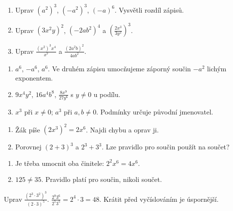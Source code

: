 \documentclass[11pt,a4paper]{article}
\begin{document}



\begin{zadaniReseniBox}[title={Základ: který vzorec použít jako první?},breakable=false]
\begin{enumerate}[label=\alph*)]
\item Uprav $(a^2)^3$, $(-a^2)^3$, $(-a)^6$. Vysvětli rozdíl zápisů.
\item Uprav $(3x^2y)^2$, $(-2ab^2)^4$ a $\left(\frac{2x^3}{3y^2}\right)^3$.
\item Uprav $\frac{(x^2)^3x^4}{x^7}$ a $\frac{(2a^2b)^2}{4ab^2}$.
\end{enumerate}
\tcblower
\begin{enumerate}[label=\alph*)]
\item $a^6$, $-a^6$, $a^6$. Ve druhém zápisu umocňujeme záporný součin $-a^2$ lichým exponentem.
\item $9x^4y^2$, $16a^4b^8$, $\frac{8x^9}{27y^6}$ s $y\ne0$ u podílu.
\item $x^3$ při $x\ne0$; $a^3$ při $a,b\ne0$. Podmínky určuje původní jmenovatel.
\end{enumerate}
\end{zadaniReseniBox}

\begin{zadaniReseniBox}[title={Rezerva: najdi neplatný krok},breakable=false]
\begin{enumerate}[label=\alph*)]
\item Žák píše $(2x^3)^2=2x^6$. Najdi chybu a oprav ji.
\item Porovnej $(2+3)^3$ a $2^3+3^3$. Lze pravidlo pro součin použít na součet?
\end{enumerate}
\tcblower
\begin{enumerate}[label=\alph*)]
\item Je třeba umocnit oba činitele: $2^2x^6=4x^6$.
\item $125\ne35$. Pravidlo platí pro součin, nikoli součet.
\end{enumerate}
\end{zadaniReseniBox}


\begin{prikladReseniBox}[title={Rozšíření procvičení},breakable=false]
Uprav $\frac{(2^3\cdot3^2)^3}{(2\cdot3)^5}$.
\tcblower
$\frac{2^9 3^6}{2^5 3^5}=2^4\cdot3=48$. Krátit před vyčíslováním je úspornější.
\end{prikladReseniBox}
\end{document}
